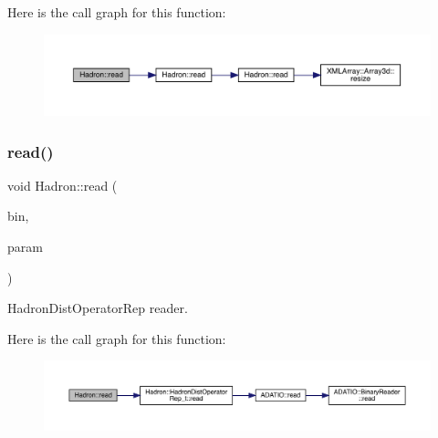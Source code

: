 Here is the call graph for this function\+:
\nopagebreak
\begin{figure}[H]
\begin{center}
\leavevmode
\includegraphics[width=350pt]{d1/daf/namespaceHadron_af2bd5c5dd10efe01fefda4ec1c5ce04d_cgraph}
\end{center}
\end{figure}
\mbox{\label{namespaceHadron_adeba574c3428db28a2e7054d5f4d32d6}} 
\subsubsection{\texorpdfstring{read()}{read()}\hspace{0.1cm}{\footnotesize\ttfamily [91/94]}}
{\footnotesize\ttfamily void Hadron\+::read (\begin{DoxyParamCaption}\item[{\mbox{\hyperlink{classADATIO_1_1BinaryReader}{Binary\+Reader}} \&}]{bin,  }\item[{\mbox{\hyperlink{classHadron_1_1HadronDistOperatorRep__t}{Hadron\+Dist\+Operator\+Rep\+\_\+t}} \&}]{param }\end{DoxyParamCaption})}



Hadron\+Dist\+Operator\+Rep reader. 

Here is the call graph for this function\+:
\nopagebreak
\begin{figure}[H]
\begin{center}
\leavevmode
\includegraphics[width=350pt]{d1/daf/namespaceHadron_adeba574c3428db28a2e7054d5f4d32d6_cgraph}
\end{center}
\end{figure}
\mbox{\label{namespaceHadron_ae80a1bcfb7767fb7993d4a439d6493ba}} 
